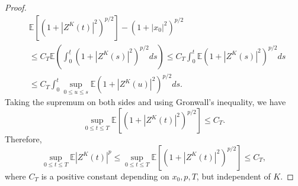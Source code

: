 \documentclass[preprint,12pt,compress]{elsarticle}
\begin{document}
\begin{proof}
\begin{equation*}
\begin{split}
	&\mathbb{E}\left[ {{{\left( {1 + {{\left| {Z^K (t)} \right|}^2}} \right)}^{p/2}}} \right] -{\left( {1 + {{\left| {{x_0}} \right|}^2}} \right)^{p/2}}  \\
	&\le  {C_T}\mathbb{E}\left( {\int_0^{\underline{t}} {{{\left( {1 + {{\left| {{Z^K}(s)} \right|}^2}} \right)}^{p/2}}ds} } \right) 
	\le  {C_T}\int_0^t {\mathbb{E}{{\left( {1 + {{\left| {{{Z}^K}(s)} \right|}^2}} \right)}^{p/2}}ds} \\
	&\le  {C_T}\int_0^t {\mathop {\sup }\limits_{0 \le u \le s} \mathbb{E}{{\left( {1 + {{\left| {{{Z}^K}(u)} \right|}^2}} \right)}^{p/2}}ds} .
\end{split}
\end{equation*} 
Taking the supremum on both sides and using Gronwall's inequality, we have
\begin{equation*}
	\mathop {\sup }\limits_{0 \le t \le T} \mathbb{E}\left[ {{{\left( {1 + {{\left| {{{ Z}^K}(t)} \right|}^2}} \right)}^{p/2}}} \right] \le {C_T} .
\end{equation*}
Therefore,
\begin{equation}  \label{a29}
	\mathop {\sup }\limits_{0 \le t \le T} \mathbb{E}{\left| {{{Z}^K}(t)} \right|^p} \le \mathop {\sup }\limits_{0 \le t \le T} \mathbb{E}\left[ {{{\left( {1 + {{\left| {{{Z}^K}(t)} \right|}^2}} \right)}^{p/2}}} \right] \le {C_T},
\end{equation}
where $C_T$ is a positive constant depending on $x_0, p, T$, but independent of $K$.


\end{proof}
\end{document}

